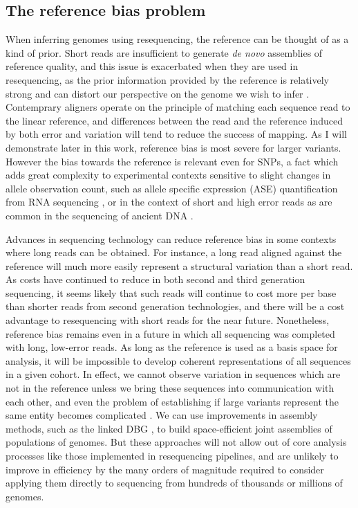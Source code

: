\subsection{The reference bias problem}

When inferring genomes using resequencing, the reference can be thought of as a kind of prior.
Short reads are insufficient to generate \emph{de novo} assemblies of reference quality, and this issue is exacerbated when they are used in resequencing, as the prior information provided by the reference is relatively strong and can distort our perspective on the genome we wish to infer \cite{sudmant2015integrated}.
Contemprary aligners operate on the principle of matching each sequence read to the linear reference, and differences between the read and the reference induced by both error and variation will tend to reduce the success of mapping.
As I will demonstrate later in this work, reference bias is most severe for larger variants.
However the bias towards the reference is relevant even for SNPs, a fact which adds great complexity to experimental contexts sensitive to slight changes in allele observation count, such as allele specific expression (ASE) quantification from RNA sequencing \cite{stevenson2013sources}, or in the context of short and high error reads as are common in the sequencing of ancient DNA \cite{zhou2017antcaller}.

Advances in sequencing technology can reduce reference bias in some contexts where long reads can be obtained.
For instance, a long read aligned against the reference will much more easily represent a structural variation than a short read.
As costs have continued to reduce in both second and third generation sequencing, it seems likely that such reads will continue to cost more per base than shorter reads from second generation technologies, and there will be a cost advantage to resequencing with short reads for the near future.
Nonetheless, reference bias remains even in a future in which all sequencing was completed with long, low-error reads.
As long as the reference is used as a basis space for analysis, it will be impossible to develop coherent representations of all sequences in a given cohort.
In effect, we cannot observe variation in sequences which are not in the reference unless we bring these sequences into communication with each other, and even the problem of establishing if large variants represent the same entity becomes complicated \cite{chaisson2018multi}.
We can use improvements in assembly methods, such as the linked DBG \cite{turner2018integrating}, to build space-efficient joint assemblies of populations of genomes.
But these approaches will not allow out of core analysis processes like those implemented in resequencing pipelines, and are unlikely to improve in efficiency by the many orders of magnitude required to consider applying them directly to sequencing from hundreds of thousands or millions of genomes.

